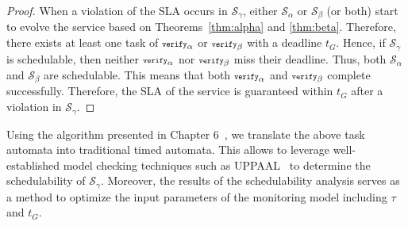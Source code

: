 \begin{proof}
When a violation of the SLA occurs in $\mathcal{S}_\gamma$, either $\mathcal{S}_\alpha$ or $\mathcal{S}_\beta$ (or both) start to evolve the service based on Theorems~\ref{thm:alpha} and \ref{thm:beta}.
Therefore, there exists at least one task of ${\scriptsize\texttt{verify}}_\alpha$ or ${\scriptsize\texttt{verify}}_\beta$ with a deadline $t_G$.
% 
Hence, if $\mathcal{S}_\gamma$ is schedulable, then neither ${\scriptsize\texttt{verify}}_\alpha$ nor ${\scriptsize\texttt{verify}}_\beta$ miss their deadline.
Thus, both $\mathcal{S}_\alpha$ and $\mathcal{S}_\beta$ are schedulable.
This means that both ${\scriptsize\texttt{verify}}_\alpha$ and ${\scriptsize\texttt{verify}}_\beta$ complete successfully.
Therefore, the SLA of the service is guaranteed within $t_G$ after a violation in $\mathcal{S}_\gamma$.
\end{proof}

Using the algorithm presented in Chapter 6~\cite{jaghoori2010time}, we translate the above task automata into traditional timed automata.
This allows to leverage well-established model checking techniques such as UPPAAL~\cite{uppaal2004} to determine the schedulability of $\mathcal{S}_\gamma$.
Moreover, the results of the schedulability analysis serves as a method to optimize the input parameters of the monitoring model including $\tau$ and $t_G$.